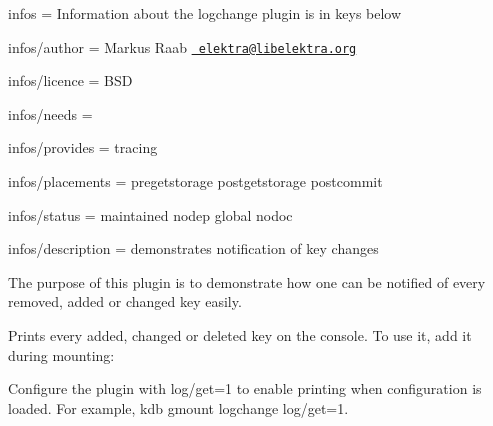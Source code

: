 
\begin{DoxyItemize}
\item infos = Information about the logchange plugin is in keys below
\item infos/author = Markus Raab \href{mailto:elektra@libelektra.org}{\texttt{ elektra@libelektra.\+org}}
\item infos/licence = B\+SD
\item infos/needs =
\item infos/provides = tracing
\item infos/placements = pregetstorage postgetstorage postcommit
\item infos/status = maintained nodep global nodoc
\item infos/description = demonstrates notification of key changes
\end{DoxyItemize}

The purpose of this plugin is to demonstrate how one can be notified of every removed, added or changed key easily.

Prints every added, changed or deleted key on the console. To use it, add it during mounting\+:


\begin{DoxyCode}{0}
\end{DoxyCode}


Configure the plugin with {\ttfamily log/get=1} to enable printing when configuration is loaded. For example, {\ttfamily kdb gmount logchange log/get=1}. 